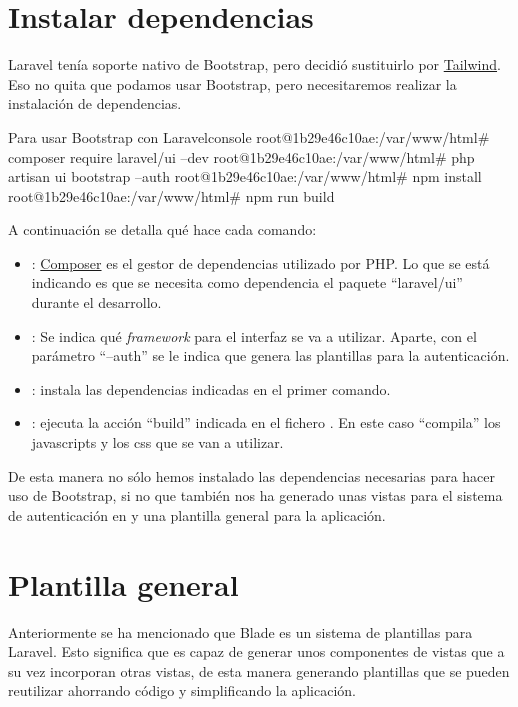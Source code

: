 \chapter{Instalar dependencias}

Laravel tenía soporte nativo de Bootstrap, pero decidió sustituirlo por \href{https://tailwindcss.com/}{Tailwind}. Eso no quita que podamos usar Bootstrap, pero necesitaremos realizar la instalación de dependencias.

\begin{mycode}{Para usar Bootstrap con Laravel}{console}{}
root@1b29e46c10ae:/var/www/html# composer require laravel/ui --dev
root@1b29e46c10ae:/var/www/html# php artisan ui bootstrap --auth
root@1b29e46c10ae:/var/www/html# npm install
root@1b29e46c10ae:/var/www/html# npm run build
\end{mycode}

A continuación se detalla qué hace cada comando:
\begin{itemize}
    \item {}: \href{https://getcomposer.org/}{Composer} es el gestor de dependencias utilizado por PHP. Lo que se está indicando es que se necesita como dependencia el paquete “laravel/ui” durante el desarrollo.
    \item {}: Se indica qué \textit{framework} para el interfaz se va a utilizar. Aparte, con el parámetro “--auth” se le indica que genera las plantillas para la autenticación.
    \item {}: instala las dependencias indicadas en el primer comando.
    \item {}: ejecuta la acción “build” indicada en el fichero . En este caso “compila” los javascripts y los css que se van a utilizar.
\end{itemize}

De esta manera no sólo hemos instalado las dependencias necesarias para hacer uso de Bootstrap, si no que también nos ha generado unas vistas para el sistema de autenticación en  y una plantilla general para la aplicación.


\chapter{Plantilla general}

Anteriormente se ha mencionado que Blade es un sistema de plantillas para Laravel. Esto significa que es capaz de generar unos componentes de vistas que a su vez incorporan otras vistas, de esta manera generando plantillas que se pueden reutilizar ahorrando código y simplificando la aplicación.


